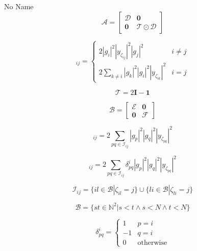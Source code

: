 \documentclass[a4paper,10pt]{article}
\begin{document}
\begin{section}{No Name}
\begin{equation}
\boldsymbol{\mathcal{A}} =
\begin{bmatrix}
\boldsymbol{\mathcal{D}} & \boldsymbol{0}\\
\boldsymbol{0} & \boldsymbol{\mathcal{T}}\odot\boldsymbol{\mathcal{D}}
\end{bmatrix}
\end{equation}

\begin{equation}
[\boldsymbol{\mathcal{D}}]_{ij} = 
\begin{cases}
2|g_i|^2|y_{\zeta_{ij}}|^2|g_j|^2 & i\neq j\\
2\sum_{k \neq i} |g_k|^2|g_i|^2|y_{\zeta_{ik}}|^2 & i = j
\end{cases}
\end{equation}

\begin{equation}
\boldsymbol{\mathcal{T}} = 2\boldsymbol{I}-\boldsymbol{1}
\end{equation}

\begin{equation}
\boldsymbol{\mathcal{B}} =
\begin{bmatrix}
\boldsymbol{\mathcal{E}} & \boldsymbol{0}\\
\boldsymbol{0} & \boldsymbol{\mathcal{F}}
\end{bmatrix}
\end{equation}

\begin{equation}
[\boldsymbol{\mathcal{E}}]_{ij} = 2\sum_{pq\in\mathcal{I}_{ij}} |g_p|^2|g_q|^2|y_{\zeta_{pq}}|^2
\end{equation}

\begin{equation}
[\boldsymbol{\mathcal{F}}]_{ij} = 2\sum_{pq\in\mathcal{I}_{ij}} \delta_{pq}^i |g_p|^2|g_q|^2|y_{\zeta_{pq}}|^2
\end{equation}

\begin{equation}
\mathcal{I}_{ij} = \{il\in\mathcal{B}|\zeta_{il}=j\}\cup\{li\in\mathcal{B}|\zeta_{li}=j\} 
\end{equation}

\begin{equation}
\mathcal{B} = \{st\in\mathbb{N}^2|s<t \wedge s<N \wedge t<N\}
\end{equation}

\begin{equation}
\delta_{pq}^i = 
\begin{cases}
1 & p = i\\
-1 & q = i\\
0 & \textrm{otherwise}
\end{cases}
\end{equation}


\end{section}
\end{document}
